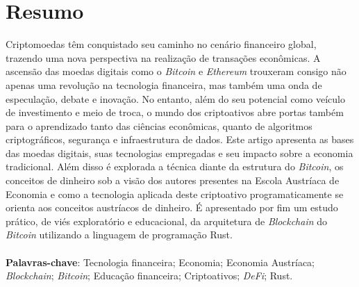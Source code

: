 \documentclass[article,12pt,oneside,a4paper,english,brazil]{unifil}
\date{}
\begin{document}
\frenchspacing
\maketitle
\normalsize

\fontsize{10}{1}\selectfont
\section*{Resumo}
Criptomoedas têm conquistado seu caminho no cenário financeiro global, trazendo uma nova perspectiva na realização de transações econômicas. A ascensão das moedas digitais como o \textit{Bitcoin} e \textit{Ethereum} trouxeram consigo não apenas uma revolução na tecnologia financeira, mas também uma onda de especulação, debate e inovação. No entanto, além do seu potencial como veículo de investimento e meio de troca, o mundo dos criptoativos abre portas também para o aprendizado tanto das ciências econômicas, quanto de algoritmos criptográficos, segurança e infraestrutura de dados. Este artigo apresenta as bases das moedas digitais, suas tecnologias empregadas e seu impacto sobre a economia tradicional. Além disso é explorada a técnica diante da estrutura do \textit{Bitcoin}, os conceitos de dinheiro sob a visão dos autores presentes na Escola Austríaca de Economia e como a tecnologia aplicada deste criptoativo programaticamente se orienta aos conceitos austríacos de dinheiro. É apresentado por fim um estudo prático, de viés exploratório e educacional, da arquitetura de \textit{Blockchain} do \textit{Bitcoin} utilizando a linguagem de programação Rust.\\
\vspace{\onelineskip} \\
\noindent
\textbf{Palavras-chave}: Tecnologia financeira; Economia; Economia Austríaca; \textit{Blockchain}; \textit{Bitcoin}; Educação financeira; Criptoativos; \textit{DeFi}; Rust.
\end{document}
